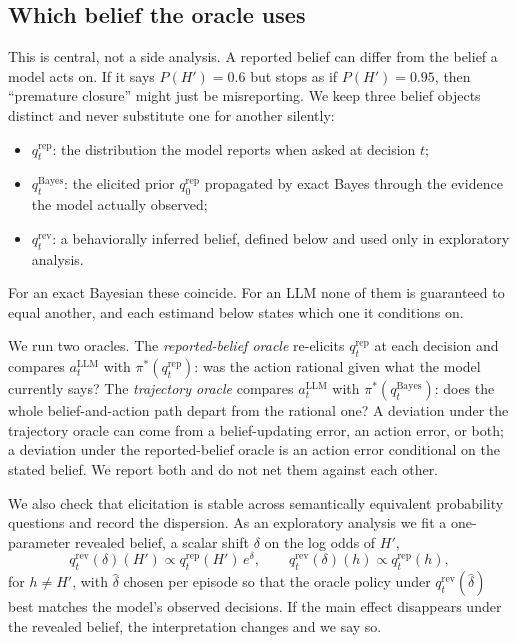 \documentclass[10pt,letterpaper,twocolumn]{article}
\newcommand{\rep}{\mathrm{rep}}
\newcommand{\Bayes}{\mathrm{Bayes}}
\newcommand{\rev}{\mathrm{rev}}
\begin{document}
\subsection{Which belief the oracle uses}
\label{sec:beliefs}
This is central, not a side analysis. A reported belief can differ from the belief a model acts on. If it says $P(H') = 0.6$ but stops as if $P(H') = 0.95$, then ``premature closure'' might just be misreporting. We keep three belief objects distinct and never substitute one for another silently:
\begin{itemize}
\item $q_t^{\rep}$: the distribution the model reports when asked at decision $t$;
\item $q_t^{\Bayes}$: the elicited prior $q_0^{\rep}$ propagated by exact Bayes through the evidence the model actually observed;
\item $q_t^{\rev}$: a behaviorally inferred belief, defined below and used only in exploratory analysis.
\end{itemize}
For an exact Bayesian these coincide. For an LLM none of them is guaranteed to equal another, and each estimand below states which one it conditions on.

We run two oracles. The \emph{reported-belief oracle} re-elicits $q_t^{\rep}$ at each decision and compares $a_t^{\mathrm{LLM}}$ with $\pi^*(q_t^{\rep})$: was the action rational given what the model currently says? The \emph{trajectory oracle} compares $a_t^{\mathrm{LLM}}$ with $\pi^*(q_t^{\Bayes})$: does the whole belief-and-action path depart from the rational one? A deviation under the trajectory oracle can come from a belief-updating error, an action error, or both; a deviation under the reported-belief oracle is an action error conditional on the stated belief. We report both and do not net them against each other.

We also check that elicitation is stable across semantically equivalent probability questions \citep{sclar2024quantifying} and record the dispersion. As an exploratory analysis we fit a one-parameter revealed belief, a scalar shift $\delta$ on the log odds of $H'$,
\[
q^{\rev}_t(\delta)(H') \propto q_t^{\rep}(H')\,e^{\delta}, \qquad q^{\rev}_t(\delta)(h) \propto q_t^{\rep}(h),
\]
for $h \neq H'$, with $\hat\delta$ chosen per episode so that the oracle policy under $q_t^{\rev}(\hat\delta)$ best matches the model's observed decisions. If the main effect disappears under the revealed belief, the interpretation changes and we say so.
\end{document}
